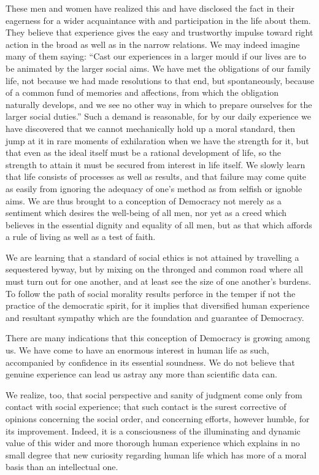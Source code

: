 \documentclass[]{article}
\begin{document}
\begin{sectionbody}
\addamsparagraph These men and women have realized this and have disclosed the fact in
their eagerness for a wider acquaintance with and participation in the
life about them. They believe that experience gives the easy and
trustworthy impulse toward right action in the broad as well as in the
narrow relations. We may indeed imagine many of them saying: ``Cast our
experiences in a larger mould if our lives are to be animated by the
larger social aims. We have met the obligations of our family life, not
because we had made resolutions to that end, but spontaneously, because
of a common fund of memories and affections, from which the obligation
naturally develops, and we see no other way in which to prepare
ourselves for the larger social duties.'' Such a demand is reasonable,
for by our daily experience we have discovered that we cannot
mechanically hold up a moral standard, then jump at it in rare moments
of exhilaration when we have the strength for it, but that even as the
ideal itself must be a rational development of life, so the strength to
attain it must be secured from interest in life itself. We slowly learn
that life consists of processes as well as results, and that failure may
come quite as easily from ignoring the adequacy of one's method as from
selfish or ignoble aims. We are thus brought to a conception of
Democracy not merely as a sentiment which desires the well-being of all
men, nor yet as a creed which believes in the essential dignity and
equality of all men, but as that which affords a rule of living as well
as a test of faith.

\addamsparagraph We are learning that a standard of social ethics is not attained by
travelling a sequestered byway, but by mixing on the thronged and common
road where all must turn out for one another, and at least see the size
of one another's burdens. To follow the path of social morality results
perforce in the temper if not the practice of the democratic spirit, for
it implies that diversified human experience and resultant sympathy
which are the foundation and guarantee of Democracy.

\addamsparagraph There are many indications that this conception of Democracy is growing
among us. We have come to have an enormous interest in human life as
such, accompanied by confidence in its essential soundness. We do not
believe that genuine experience can lead us astray any more than
scientific data can.

\addamsparagraph We realize, too, that social perspective and sanity of judgment come
only from contact with social experience; that such contact is the
surest corrective of opinions concerning the social order, and
concerning efforts, however humble, for its improvement. Indeed, it is a
consciousness of the illuminating and dynamic value of this wider and
more thorough human experience which explains in no small degree that
new curiosity regarding human life which has more of a moral basis than
an intellectual one.


\end{sectionbody}
\end{document}
